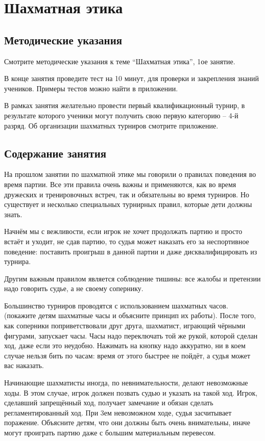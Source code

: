 \chapter{Шахматная этика}

\section{Методические указания}

Смотрите методические указания к теме ``Шахматная этика'', 1ое занятие.

В конце занятия проведите тест на 10 минут, для проверки и закрепления знаний учеников. Примеры тестов можно найти в приложении.

В рамках занятия желательно провести первый квалификационный турнир, в результате которого ученики могут получить свою первую категорию – 4-й разряд. Об организации шахматных турниров смотрите приложение.

\section{Содержание занятия}

На прошлом занятии по шахматной этике мы говорили о правилах поведения во время партии. Все эти правила очень важны и применяются, как во время дружеских и тренировочных встреч, так и обязательны во время турниров. Но существует и несколько специальных турнирных правил, которые дети должны знать.

Начнём мы с вежливости, если игрок не хочет продолжать партию и просто встаёт и уходит, не сдав партию, то судья может наказать его за неспортивное поведение: поставить проигрыш в данной партии и даже дисквалифицировать из турнира.

Другим важным правилом является соблюдение тишины: все жалобы и претензии надо говорить судье, а не своему сопернику.

Большинство турниров проводятся с использованием шахматных часов. (покажите детям шахматные часы и объясните принцип их работы). После того, как соперники поприветствовали друг друга, шахматист, играющий чёрными фигурами, запускает часы. Часы надо переключать той же рукой, которой сделан ход, даже если это неудобно. Нажимать на кнопку надо аккуратно, ни в коем случае нельзя бить по часам: время от этого быстрее не пойдёт, а судья может вас наказать.

Начинающие шахматисты иногда, по невнимательности, делают невозможные ходы. В этом случае, игрок должен позвать судью и указать на такой ход. Игрок, сделавший запрещённый ход, получает замечание и обязан сделать регламентированный ход. При 3ем невозможном ходе, судья засчитывает поражение. Объясните детям, что они должны быть очень внимательны, иначе могут проиграть партию даже с большим материальным перевесом.

